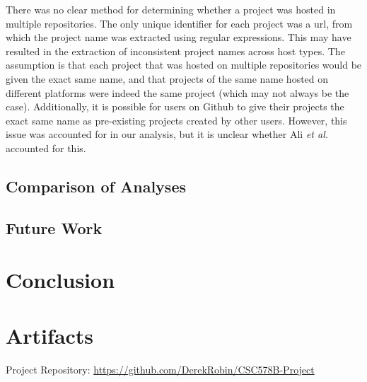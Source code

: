 \documentclass[acmconf]{acmart}
\begin{document}
There was no clear method for determining whether a project was hosted in multiple repositories.
The only unique identifier for each project was a url, from which the project name was extracted using regular expressions.
This may have resulted in the extraction of inconsistent project names across host types.
The assumption is that each project that was hosted on multiple repositories would be given the exact same name, and that projects of the same name hosted on different platforms were indeed the same project (which may not always be the case).
Additionally, it is possible for users on Github to give their projects the exact same name as pre-existing projects created by other users.
However, this issue was accounted for in our analysis, but it is unclear whether Ali \emph{et al.} accounted for this.

\subsection{Comparison of Analyses}

\subsection{Future Work}

\section{Conclusion}




\appendix

\section{Artifacts}
Project Repository: \url{https://github.com/DerekRobin/CSC578B-Project}
\end{document}
